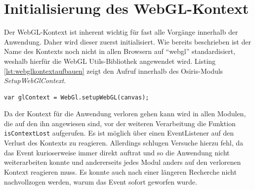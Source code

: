 \section{Initialisierung des WebGL-Kontext}
Der WebGL-Kontext ist inherent wichtig für fast alle Vorgänge innerhalb der Anwendung. Daher wird dieser zuerst initialisiert. Wie bereits beschrieben ist der Name des Kontexts noch nicht in allen Browsern auf "`webgl"' standardisiert, weshalb hierfür die WebGL Utils-Bibliothek angewendet wird. Listing \ref{lst:webglkontextaufbauen} zeigt den Aufruf innerhalb des Osiris-Moduls \textit{SetupWebGlContext}.
\lstset{language=JavaScript}
\begin{lstlisting}[caption={Initialisierung des WebGL-Kontext}, label={lst:webglkontextaufbauen}]
var glContext = WebGl.setupWebGL(canvas);
\end{lstlisting}
Da der Kontext für die Anwendung verloren gehen kann wird in allen Modulen, die auf den ihn angewiesen sind, vor der weiteren Verarbeitung die Funktion \texttt{isContextLost} aufgerufen. Es ist möglich über einen EventListener auf den Verlust des Kontexts zu reagieren. Allerdings schlugen Versuche hierzu fehl, da das Event kurioserweise immer direkt auftrat und so die Anwendung nicht weiterarbeiten konnte und andererseits jedes Modul anders auf den verlorenen Kontext reagieren muss. Es konnte auch nach einer längeren Recherche nicht nachvollzogen werden, warum das Event sofort geworfen wurde.

